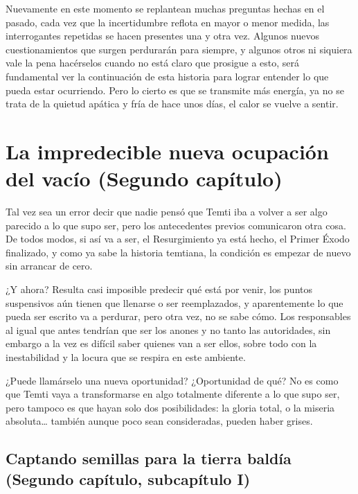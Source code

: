\documentclass[
  spanish,
]{book}
\begin{document}
Nuevamente en este momento se replantean muchas preguntas hechas en el pasado, cada vez que la incertidumbre reflota en mayor o menor medida, las interrogantes repetidas se hacen presentes una y otra vez. Algunos nuevos cuestionamientos que surgen perdurarán para siempre, y algunos otros ni siquiera vale la pena hacérselos cuando no está claro que prosigue a esto, será fundamental ver la continuación de esta historia para lograr entender lo que pueda estar ocurriendo.
Pero lo cierto es que se transmite más energía, ya no se trata de la quietud apática y fría de hace unos días, el calor se vuelve a sentir.

\hypertarget{la-impredecible-nueva-ocupaciuxf3n-del-vacuxedo-segundo-capuxedtulo}{%
\chapter{La impredecible nueva ocupación del vacío (Segundo capítulo)}\label{la-impredecible-nueva-ocupaciuxf3n-del-vacuxedo-segundo-capuxedtulo}}

Tal vez sea un error decir que nadie pensó que Temti iba a volver a ser algo parecido a lo que supo ser, pero los antecedentes previos comunicaron otra cosa. De todos modos, si así va a ser, el Resurgimiento ya está hecho, el Primer Éxodo finalizado, y como ya sabe la historia temtiana, la condición es empezar de nuevo sin arrancar de cero.

¿Y ahora?
Resulta casi imposible predecir qué está por venir, los puntos suspensivos aún tienen que llenarse o ser reemplazados, y aparentemente lo que pueda ser escrito va a perdurar, pero otra vez, no se sabe cómo. Los responsables al igual que antes tendrían que ser los anones y no tanto las autoridades, sin embargo a la vez es difícil saber quienes van a ser ellos, sobre todo con la inestabilidad y la locura que se respira en este ambiente.

¿Puede llamárselo una nueva oportunidad? ¿Oportunidad de qué?
No es como que Temti vaya a transformarse en algo totalmente diferente a lo que supo ser, pero tampoco es que hayan solo dos posibilidades: la gloria total, o la miseria absoluta\ldots{} también aunque poco sean consideradas, pueden haber grises.

\hypertarget{captando-semillas-para-la-tierra-balduxeda-segundo-capuxedtulo-subcapuxedtulo-i}{%
\section{Captando semillas para la tierra baldía (Segundo capítulo, subcapítulo I)}\label{captando-semillas-para-la-tierra-balduxeda-segundo-capuxedtulo-subcapuxedtulo-i}}
\end{document}
